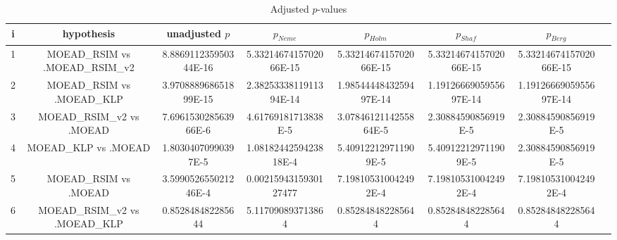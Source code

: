 \documentclass[a4paper,10pt]{article}
\begin{document}
\begin{landscape}
\begin{table}[!htp]
\centering\tiny
\caption{Adjusted $p$-values}
\begin{tabular}{cccccccc}
i&hypothesis&unadjusted $p$&$p_{Neme}$&$p_{Holm}$&$p_{Shaf}$&$p_{Berg}$\\
\hline
1&MOEAD_RSIM vs .MOEAD_RSIM_v2&8.886911235950344E-16&5.3321467415702066E-15&5.3321467415702066E-15&5.3321467415702066E-15&5.3321467415702066E-15\\
2&MOEAD_RSIM vs .MOEAD_KLP&3.970888968651899E-15&2.3825333811911394E-14&1.9854444843259497E-14&1.1912666905955697E-14&1.1912666905955697E-14\\
3&MOEAD_RSIM_v2 vs .MOEAD&7.696153028563966E-6&4.61769181713838E-5&3.0784612114255864E-5&2.30884590856919E-5&2.30884590856919E-5\\
4&MOEAD_KLP vs .MOEAD&1.80304070990397E-5&1.0818244259423818E-4&5.409122129711909E-5&5.409122129711909E-5&2.30884590856919E-5\\
5&MOEAD_RSIM vs .MOEAD&3.599052655021246E-4&0.0021594315930127477&7.198105310042492E-4&7.198105310042492E-4&7.198105310042492E-4\\
6&MOEAD_RSIM_v2 vs .MOEAD_KLP&0.852848482285644&5.117090893713864&0.852848482285644&0.852848482285644&0.852848482285644\\
\hline
\end{tabular}
\end{table}

\end{landscape}
\end{document}
